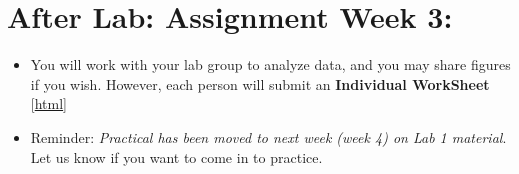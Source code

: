 \documentclass[
  letterpaper,
  DIV=11,
  numbers=noendperiod,
  oneside]{scrartcl}
\providecommand{\tightlist}{%
  \setlength{\itemsep}{0pt}\setlength{\parskip}{0pt}}\usepackage{longtable,booktabs,array}
\begin{document}
\hypertarget{after-lab-assignment-week-3}{%
\section{After Lab: Assignment Week
3:}\label{after-lab-assignment-week-3}}

\begin{itemize}
\tightlist
\item
  You will work with your lab group to analyze data, and you may share
  figures if you wish. However, each person will submit an
  \textbf{Individual WorkSheet} {[}\href{Lab3ws.qmd}{html}{]}
\item
  Reminder: \emph{Practical has been moved to next week (week 4) on Lab
  1 material}. Let us know if you want to come in to practice.
\end{itemize}
\end{document}
